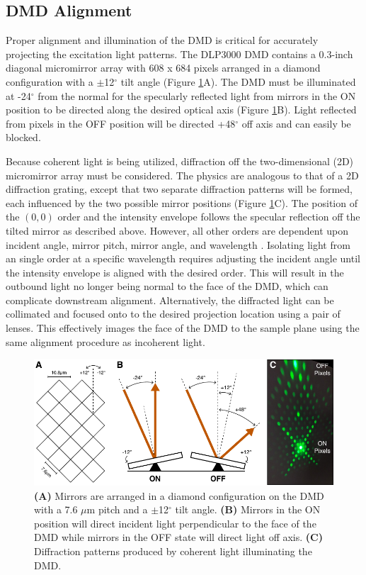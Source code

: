 \subsection{DMD Alignment} \label{ssec:dmd_alignment}

Proper alignment and illumination of the DMD is critical for accurately projecting the excitation light patterns. The DLP3000 DMD contains a 0.3-inch diagonal micromirror array with 608 x 684 pixels arranged in a diamond configuration with a $\pm$12$^\circ$ tilt angle (Figure \ref{fig:dmdmirror}A). The DMD must be illuminated at -24$^\circ$ from the normal for the specularly reflected light from mirrors in the ON position to be directed along the desired optical axis (Figure \ref{fig:dmdmirror}B). Light reflected from pixels in the OFF position will be directed +48$^\circ$ off axis and can easily be blocked.

Because coherent light is being utilized, diffraction off the two-dimensional (2D) micromirror array must be considered. The physics are analogous to that of a 2D diffraction grating, except that two separate diffraction patterns will be formed, each influenced by the two possible mirror positions (Figure \ref{fig:dmdmirror}C). The position of the $(0,0)$ order and the intensity envelope follows the specular reflection off the tilted mirror as described above. However, all other orders are dependent upon incident angle, mirror pitch, mirror angle, and wavelength \cite{TexasInstruments:2009tr}. Isolating light from an single order at a specific wavelength requires adjusting the incident angle until the intensity envelope is aligned with the desired order. This will result in the outbound light no longer being normal to the face of the DMD, which can complicate downstream alignment. Alternatively, the diffracted light can be collimated and focused onto to the desired projection location using a pair of lenses. This effectively images the face of the DMD to the sample plane using the same alignment procedure as incoherent light.

\begin{figure}
    \includegraphics{figures/chapter_2/dmdmirror.pdf}
    \caption{
        \label{fig:dmdmirror}
        \textbf{(A)} Mirrors are arranged in a diamond configuration on the DMD with a 7.6 $\mu$m pitch and a $\pm$12$^\circ$ tilt angle. \textbf{(B)} Mirrors in the ON position will direct incident light perpendicular to the face of the DMD while mirrors in the OFF state will direct light off axis. \textbf{(C)} Diffraction patterns produced by coherent light illuminating the DMD.
    }
\end{figure}

